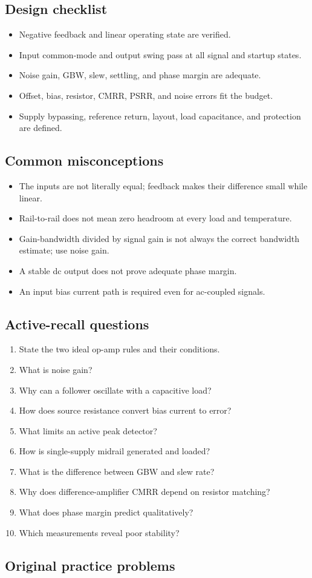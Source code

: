 \documentclass[10pt,letterpaper]{article}
\begin{document}
\subsection{Design checklist}
\begin{itemize}
  \item Negative feedback and linear operating state are verified.
  \item Input common-mode and output swing pass at all signal and startup states.
  \item Noise gain, GBW, slew, settling, and phase margin are adequate.
  \item Offset, bias, resistor, CMRR, PSRR, and noise errors fit the budget.
  \item Supply bypassing, reference return, layout, load capacitance, and protection are defined.
\end{itemize}\subsection{Common misconceptions}
\begin{itemize}
  \item The inputs are not literally equal; feedback makes their difference small while linear.
  \item Rail-to-rail does not mean zero headroom at every load and temperature.
  \item Gain-bandwidth divided by signal gain is not always the correct bandwidth estimate; use noise gain.
  \item A stable dc output does not prove adequate phase margin.
  \item An input bias current path is required even for ac-coupled signals.
\end{itemize}\subsection{Active-recall questions}
\begin{enumerate}
  \item State the two ideal op-amp rules and their conditions.
  \item What is noise gain?
  \item Why can a follower oscillate with a capacitive load?
  \item How does source resistance convert bias current to error?
  \item What limits an active peak detector?
  \item How is single-supply midrail generated and loaded?
  \item What is the difference between GBW and slew rate?
  \item Why does difference-amplifier CMRR depend on resistor matching?
  \item What does phase margin predict qualitatively?
  \item Which measurements reveal poor stability?
\end{enumerate}\subsection{Original practice problems}
\end{document}
